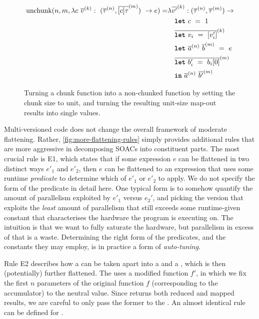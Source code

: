 \begin{figure}

  \begin{align*}
    \textrm{unchunk}(n, m, \Fn{(\nseq{\tau}{n},\nseq{[c]\tau}{m})}{c~\nseq{v}{k}}{e}) =
    & \fn \nseq{v'}{k}: (\nseq{\tau}{n},\nseq{\tau}{m}) \rightarrow \\
    & \quad \kw{let}~c~=~1\\
    & \quad \nseq{\kw{let}~v_{i}~=~[v'_{i}]}{k} \\
    & \quad \kw{let}~\nseq{a}{n}~\nseq{b}{m}~=~e \\
    & \quad \nseq{\kw{let}~b'_{i}~=~b_{i}[0]}{m} \\
    & \quad \kw{in}~\nseq{a}{n}~\nseq{b'}{m}
  \end{align*}
  \caption{Turning a chunk function into a non-chunked function by
    setting the chunk size to unit, and turning the resulting
    unit-size map-out results into single values.}
  \label{fig:unchunking}
\end{figure}

Multi-versioned code does not change the overall framework of moderate
flattening.  Rather, \cref{fig:more-flattening-rules} simply provides
additional rules that are more aggressive in decomposing SOACs into
constituent parts.  The most crucial rule is E1, which states that if
some expression $e$ can be flattened in two distinct ways $e'_{1}$ and
$e'_{2}$, then $e$ can be flattened to an  expression that uses
some runtime \textit{predicate} to determine which of $e'_{1}$ or
$e'_{2}$ to apply.  We do not specify the form of the predicate in
detail here.  One typical form is to somehow quantify the amount of
parallelism exploited by $e'_{1}$ versus $e_{2}'$, and picking the
version that exploits the \textit{least} amount of parallelism that
still exceeds some runtime-given constant that characterises the
hardware the program is executing on.  The intuition is that we want
to fully saturate the hardware, but parallelism in excess of that is a
waste.  Determining the right form of the predicates, and the
constants they may employ, is in practice a form of
\textit{auto-tuning}.

Rule E2 describes how a  can be taken apart into a
 and a , which is then (potentially) further
flattened.  The  uses a modified function $f'$, in which we
fix the first $n$ parameters of the original function $f$
(corresponding to the accumulator) to the neutral value.  Since
 returns both reduced and mapped results, we are careful
to only pass the former to the .  An almost identical rule
can be defined for .

